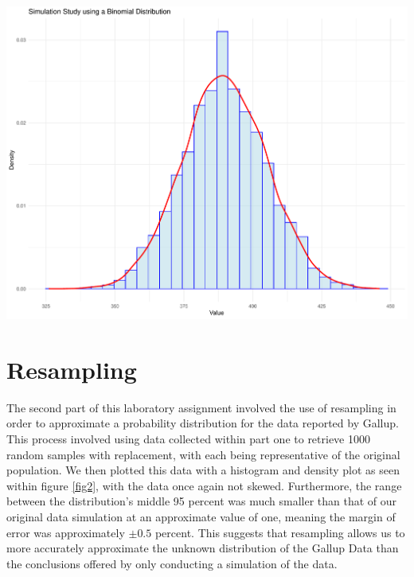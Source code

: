 \documentclass{article}\usepackage[]{graphicx}\usepackage[]{xcolor}
\newenvironment{Figure}
  {\par\medskip\noindent\minipage{\linewidth}}
  {\endminipage\par\medskip}
\begin{document}
\begin{multicols}{2}
\begin{Figure}
\includegraphics[scale=0.4]{Simplot.pdf}
\label{fig1}
\end{Figure}

\section{Resampling}
The second part of this laboratory assignment involved the use of resampling in order to approximate a probability distribution for the data reported by Gallup. This process involved using data collected within part one to retrieve 1000 random samples with replacement, with each being representative of the original population. We then plotted this data with a histogram and density plot as seen within figure \ref{fig2}, with the data once again not skewed. Furthermore, the range between the distribution's middle 95 percent was much smaller than that of our original data simulation at an approximate value of one, meaning the margin of error was approximately $\pm 0.5$ percent. This suggests that resampling allows us to more accurately approximate the unknown distribution of the Gallup Data than the conclusions offered by only conducting a simulation of the data.


\end{multicols}
\end{document}
